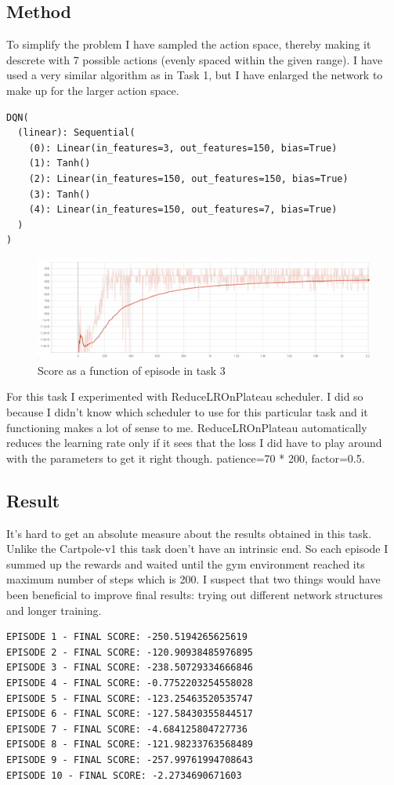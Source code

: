 \documentclass{article}
\begin{document}
\subsection{Method}
To simplify the problem I have sampled the action space, thereby making it descrete with 7 possible actions (evenly spaced within the given range). I have used a very similar algorithm as in Task 1, but I have enlarged the network to make up for the larger action space.

\begin{lstlisting}
DQN(
  (linear): Sequential(
    (0): Linear(in_features=3, out_features=150, bias=True)
    (1): Tanh()
    (2): Linear(in_features=150, out_features=150, bias=True)
    (3): Tanh()
    (4): Linear(in_features=150, out_features=7, bias=True)
  )
)
\end{lstlisting}

\begin{figure}[H]
  \begin{center}
    \includegraphics[width=\linewidth]{imgs/task_3_training.png}
      \caption{Score as a function of episode in task 3}\label{task_2_training}
  \end{center}
\end{figure}

For this task I experimented with ReduceLROnPlateau scheduler. I did so because I didn't know which scheduler to use for this particular task and it functioning makes a lot of sense to me. ReduceLROnPlateau automatically reduces the learning rate only if it sees that the loss  I did have to play around with the parameters to get it right though. patience=70 * 200, factor=0.5.

\subsection{Result}
It's hard to get an absolute measure about the results obtained in this task. Unlike the Cartpole-v1 this task doen't have an intrinsic end. So each episode I summed up the rewards and waited until the gym environment reached its maximum number of steps which is 200. I suspect that two things would have been beneficial to improve final results: trying out different network structures and longer training. 

\begin{lstlisting}
EPISODE 1 - FINAL SCORE: -250.5194265625619
EPISODE 2 - FINAL SCORE: -120.90938485976895
EPISODE 3 - FINAL SCORE: -238.50729334666846
EPISODE 4 - FINAL SCORE: -0.7752203254558028
EPISODE 5 - FINAL SCORE: -123.25463520535747
EPISODE 6 - FINAL SCORE: -127.58430355844517
EPISODE 7 - FINAL SCORE: -4.684125804727736
EPISODE 8 - FINAL SCORE: -121.98233763568489
EPISODE 9 - FINAL SCORE: -257.99761994708643
EPISODE 10 - FINAL SCORE: -2.2734690671603
\end{lstlisting}
\end{document}
